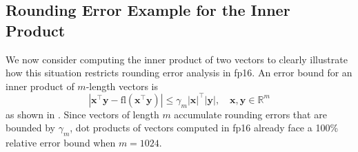 \documentclass[review,onefignum,onetabnum]{siamart190516}
\newcommand{\R}{\mathbb{R}}
\newcommand{\bb}[1]{\mathbf{#1}}
\newcommand{\fl}{\mathrm{fl}}
\begin{document}
\subsection{Rounding Error Example for the Inner Product}\label{sec:backgroundIP}
We now consider computing the inner product of two vectors to clearly illustrate how this situation restricts rounding error analysis in fp16. 
An error bound for an inner product of $m$-length vectors is
\begin{equation}
|\bb{x}^{\top}\bb{y} - \fl(\bb{x}^{\top}\bb{y})| \leq \gamma_{m} |\bb{x}|^{\top}|\bb{y}|, \quad \bb{x},\bb{y}\in\R^{m} \label{eqn:DDerr}
\end{equation}
as shown in \cite{Higham2002}.
Since vectors of length $m$ accumulate rounding errors that are bounded by $\gamma_{m}$, dot products of vectors computed in fp16 already face a 100\% relative error bound when $m=1024$. \par
\end{document}
